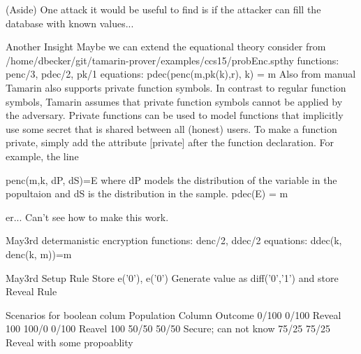 \documentclass[journal]{IEEEtran}
\begin{document}



(Aside) One attack it would be useful to find  is if the attacker can fill the database with known values...








Another Insight
Maybe we can extend the equational theory
consider from
/home/dbecker/git/tamarin-prover/examples/ccs15/probEnc.spthy
	functions: penc/3, pdec/2, pk/1
	equations: pdec(penc(m,pk(k),r), k) = m
Also from manual
Tamarin also supports private function symbols. In contrast to regular function symbols, Tamarin
assumes that private function symbols cannot be applied by the adversary. Private functions can
be used to model functions that implicitly use some secret that is shared between all (honest) users.
To make a function private, simply add the attribute [private] after the function declaration. For
example, the line


penc(m,k, dP, dS)=E
where dP models the distribution of the variable in the popultaion and dS is the distribution in the sample.
pdec(E) = m

er... Can't see how to make this work.

May3rd 
determanistic encryption
functions:
denc/2, ddec/2
equations:
ddec(k, denc(k, m))=m

May3rd
Setup Rule
Store e('0'), e('0')
Generate value as diff('0','1') and store
Reveal Rule

Scenarios for boolean colum
Population 	Column 	Outcome
0/100		0/100	Reveal 100%
100/0		0/100	Reavel 100%
50/50		50/50	Secure; can not know
75/25		75/25	Reveal with some propoablity


\end{document}

